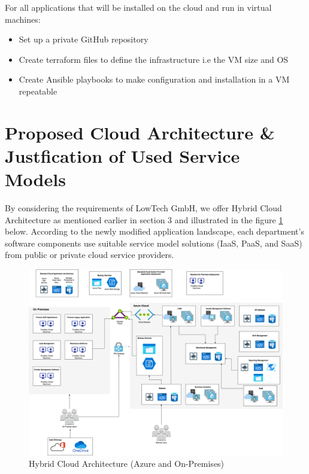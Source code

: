 \documentclass{llncs}
\begin{document}
For all applications that will be installed on the cloud and run in virtual machines:
\begin{itemize}
    \item Set up a private GitHub repository
    \item Create terraform files to define the infrastructure i.e the VM size and OS
    \item Create Ansible playbooks to make configuration and installation in a VM repeatable
\end{itemize}

\section{Proposed Cloud Architecture \& Justfication of Used Service Models}
By considering the requirements of LowTech GmbH, we offer Hybrid Cloud Architecture as mentioned earlier in section 3 and illustrated in the figure \ref{Cloud_Architecture} below. According to the newly modified application landscape, each department's software components use suitable service model solutions (IaaS, PaaS, and SaaS) from public or private cloud service providers.

\begin{figure}[htbp]
    \begin{center}
        \includegraphics[width=1\textwidth]{diagrams/AzureArchCloud.png}
        \vspace{0.01\textwidth}
        \caption{Hybrid Cloud Architecture (Azure and On-Premises)}
        \label{Cloud_Architecture} %
    \end{center}
\end{figure}
\end{document}
